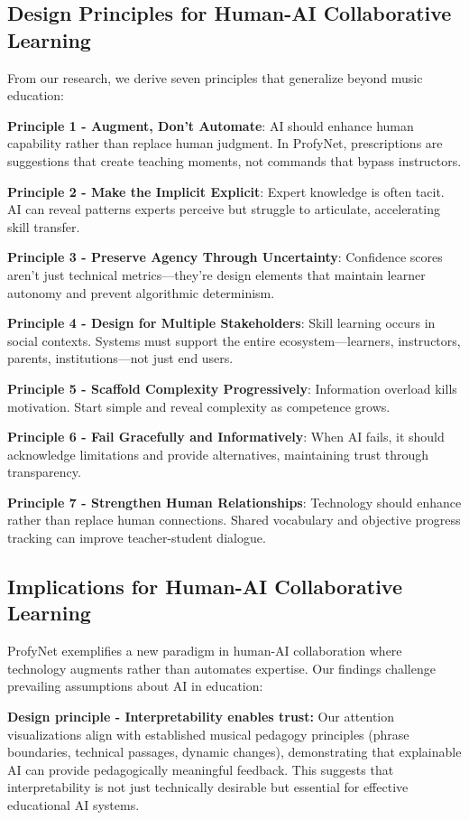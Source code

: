 \documentclass[sigconf,review,anonymous]{acmart}
\begin{document}
\subsection{Design Principles for Human-AI Collaborative Learning}

From our research, we derive seven principles that generalize beyond music education:

\textbf{Principle 1 - Augment, Don't Automate}: AI should enhance human capability rather than replace human judgment. In ProfyNet, prescriptions are suggestions that create teaching moments, not commands that bypass instructors.

\textbf{Principle 2 - Make the Implicit Explicit}: Expert knowledge is often tacit. AI can reveal patterns experts perceive but struggle to articulate, accelerating skill transfer.

\textbf{Principle 3 - Preserve Agency Through Uncertainty}: Confidence scores aren't just technical metrics—they're design elements that maintain learner autonomy and prevent algorithmic determinism.

\textbf{Principle 4 - Design for Multiple Stakeholders}: Skill learning occurs in social contexts. Systems must support the entire ecosystem—learners, instructors, parents, institutions—not just end users.

\textbf{Principle 5 - Scaffold Complexity Progressively}: Information overload kills motivation. Start simple and reveal complexity as competence grows.

\textbf{Principle 6 - Fail Gracefully and Informatively}: When AI fails, it should acknowledge limitations and provide alternatives, maintaining trust through transparency.

\textbf{Principle 7 - Strengthen Human Relationships}: Technology should enhance rather than replace human connections. Shared vocabulary and objective progress tracking can improve teacher-student dialogue.

\subsection{Implications for Human-AI Collaborative Learning}

ProfyNet exemplifies a new paradigm in human-AI collaboration where technology augments rather than automates expertise. Our findings challenge prevailing assumptions about AI in education:

\textbf{Design principle - Interpretability enables trust:} Our attention visualizations align with established musical pedagogy principles (phrase boundaries, technical passages, dynamic changes), demonstrating that explainable AI can provide pedagogically meaningful feedback. This suggests that interpretability is not just technically desirable but essential for effective educational AI systems.
\end{document}
